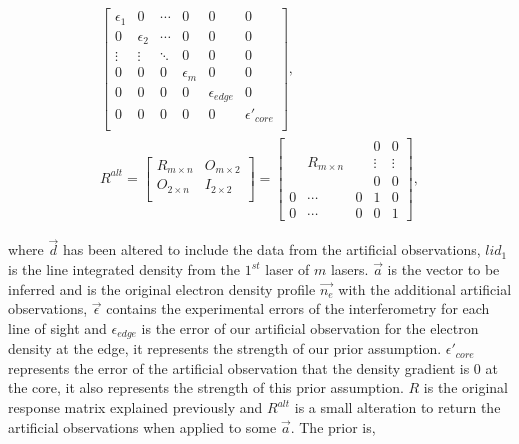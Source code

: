 \begin{equation}
\begin{aligned}
\begin{bmatrix}
\epsilon_1 & 0 & \cdots & 0 & 0 & 0\\
0 & \epsilon_2 & \cdots & 0 & 0 & 0\\
\vdots & \vdots & \ddots & 0 & 0 & 0\\
0 & 0 & 0 &\epsilon_m & 0 & 0\\
0 & 0 & 0 & 0 & \epsilon_{edge} & 0\\
0 & 0 & 0 & 0 & 0 & \epsilon'_{core}\\
\end{bmatrix},\\
R^{alt} = 
\begin{bmatrix}
 R_{m\times n} &   O_{m\times2} \\
 O_{2\times n} &   I_{2\times 2} \\
\end{bmatrix}
=
\begin{bmatrix}
 &       &    & 0         & 0\\
  &   R_{m\times n}    &    &  \vdots  & \vdots\\
  &       &    & 0        & 0\\
0 & \cdots & 0  & 1        & 0 \\
0 & \cdots & 0  & 0        & 1
\end{bmatrix},
\end{aligned}
\end{equation}

\noindent where $\vec d$ has been altered to include the data from the artificial observations, $lid_1$ is the line integrated density from the $1^{st}$ laser of $m$ lasers. $\vec a$ is the vector to be inferred and is the original electron density profile $\vec{n_e}$ with the additional artificial observations, $\vec \epsilon$ contains the experimental errors of the interferometry for each line of sight and $\epsilon_{edge}$ is the error of our artificial observation for the electron density at the edge, it represents the strength of our prior assumption. $\epsilon'_{core}$ represents the error of the artificial observation that the density gradient is 0 at the core, it also represents the strength of this prior assumption. $R$ is the original response matrix explained previously and $R^{alt}$ is a small alteration to return the artificial observations when applied to some $\vec a$. The prior is,


